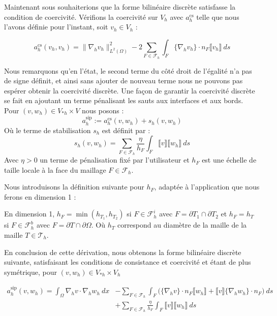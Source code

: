 Maintenant sous souhaiterions que la forme bilinéaire discrète satisfasse la condition de coercivité.
Vérifions la coercivité sur $V_h$ avec $a_h^{\text{cs}}$ telle que nous l'avons définie pour l'instant, soit $v_h \in V_h$ :

$$a_h^{\text{cs}}(v_h,v_h) = \|\nabla_h v_h\|_{L^2(\Omega)}^2 - 2 \sum_{F \in \mathcal{F}_h} \int_F \{ \nabla_h v_h \} \cdot n_F \llbracket v_h \rrbracket \ ds $$

Nous remarquons qu'en l'état, le second terme du côté droit de l'égalité n'a pas de signe définit, et ainsi sans ajouter de nouveau terme nous ne pouvons pas espérer obtenir la coercivité discrète.
Une façon de garantir la coercivité discrète se fait en ajoutant un terme pénalisant les sauts aux interfaces et aux bords.
Pour $(v,w_h) \in V_{*h}\times V$ nous posons :
$$a_h^{\text{sip}} := a_h^{\text{cs}}(v,w_h) + s_h(v,w_h) $$
Où le terme de stabilisation $s_h$ est définit par : 
$$s_h(v,w_h) = \sum_{F \in \mathcal{F}_h} \frac{\eta}{h_F} \int_F \llbracket v \rrbracket \llbracket w_h \rrbracket \ ds $$
Avec $\eta > 0$ un terme de pénalisation fixé par l'utilisateur et $h_F$ est une échelle de taille locale à la face du maillage $F \in \mathcal{F}_h$.

Nous introduisons la définition suivante pour $h_F$, adaptée à l'application que nous ferons en dimension 1 :
\begin{definitionbox}
\begin{definition}
    En dimension 1, $h_F = \min(h_{T_1},h_{T_2})$ si $F \in \mathcal{F}_h^i$ avec $F = \partial T_1 \cap \partial T_2$ et $h_F = h_T$ si $F \in \mathcal{F}_h^b$ avec $F = \partial T \cap \partial \Omega$. Où $h_T$ correspond au diamètre de la maille de la maille $T \in \mathcal{T}_h$.
\end{definition}
\end{definitionbox}

En conclusion de cette dérivation, nous obtenons la forme bilinéaire discrète suivante, satisfaisant les conditions de consistance et coercivité et étant de plus symétrique, pour $(v,w_h) \in V_{*h} \times V_h$

\begin{equation}
\begin{split}
    a_h^{\text{sip}}(v,w_h) = \int_{\Omega} \nabla_h v \cdot \nabla_h w_h \ dx &- \sum_{F \in \mathcal{F}_h} \int_F \Big( \{ \nabla_h v \} \cdot n_F \llbracket w_h \rrbracket + \llbracket v \rrbracket \{ \nabla_h w_h \} \cdot n_F \Big) \ ds \\
    &+ \sum_{F \in \mathcal{F}_h} \frac{\eta}{h_F} \int_F \llbracket v \rrbracket \llbracket w_h \rrbracket \ ds
\end{split}
\end{equation}


